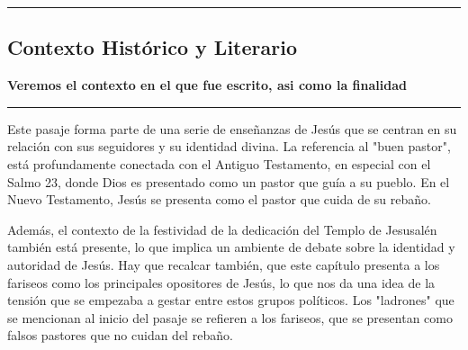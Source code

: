 {\color{gray}\hrule}
\begin{center}
\section{Contexto Histórico y Literario}
\textbf{Veremos el contexto en el que fue escrito, asi como la finalidad}
\end{center}
{\color{gray}\hrule}

\begin{multicols}{2}

  Este pasaje forma parte de una serie de enseñanzas de Jesús que se centran en su relación 
  con sus seguidores y su identidad divina. La referencia al "buen pastor", está profundamente
  conectada con el Antiguo Testamento, en especial con el Salmo 23, donde Dios es presentado como
  un pastor que guía a su pueblo. En el Nuevo Testamento, Jesús se presenta como el pastor que
  cuida de su rebaño.

  Además, el contexto de la festividad de la dedicación del Templo de Jesusalén también está presente,
  lo que implica un ambiente de debate sobre la identidad y autoridad de Jesús. Hay que recalcar también, que este capítulo
  presenta a los fariseos como los principales opositores de Jesús, lo que nos da una idea de la tensión
  que se empezaba a gestar entre estos grupos políticos. Los "ladrones" que se mencionan al inicio del pasaje
  se refieren a los fariseos, que se presentan como falsos pastores que no cuidan del rebaño.

\end{multicols}

